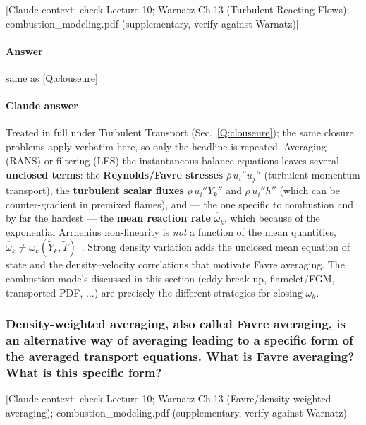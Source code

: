{\color{gray}\footnotesize [Claude context: check Lecture 10; Warnatz Ch.13 (Turbulent Reacting Flows); combustion\_modeling.pdf (supplementary, verify against Warnatz)]}

\paragraph{Answer} same as \ref{Q:clouseure}

{\color{istblue}
\paragraph{Claude answer}
Treated in full under Turbulent Transport (Sec.~\ref{Q:clouseure}); the same closure problems apply verbatim here, so only the headline is repeated. Averaging (RANS) or filtering (LES) the instantaneous balance equations leaves several \textbf{unclosed terms}: the \textbf{Reynolds/Favre stresses} $\overline{\rho}\,\widetilde{u_i''u_j''}$ (turbulent momentum transport), the \textbf{turbulent scalar fluxes} $\overline{\rho}\,\widetilde{u_i''Y_k''}$ and $\overline{\rho}\,\widetilde{u_i''h''}$ (which can be counter-gradient in premixed flames), and --- the one specific to combustion and by far the hardest --- the \textbf{mean reaction rate} $\overline{\dot\omega}_k$, which because of the exponential Arrhenius non-linearity is \emph{not} a function of the mean quantities, $\overline{\dot\omega}_k\neq\dot\omega_k(\tilde Y_k,\tilde T)$~\cite{lecture10,veynante2002turbulent,warnatz2006combustion}. Strong density variation adds the unclosed mean equation of state and the density--velocity correlations that motivate Favre averaging. The combustion models discussed in this section (eddy break-up, flamelet/FGM, transported PDF, $\dots$) are precisely the different strategies for closing $\overline{\dot\omega}_k$.
}




\subsubsection{Density-weighted averaging, also called Favre averaging, is an alternative way of averaging leading to a specific form of the averaged transport equations. What is Favre averaging? What is this specific form?}

{\color{gray}\footnotesize [Claude context: check Lecture 10; Warnatz Ch.13 (Favre/density-weighted averaging); combustion\_modeling.pdf (supplementary, verify against Warnatz)]}

